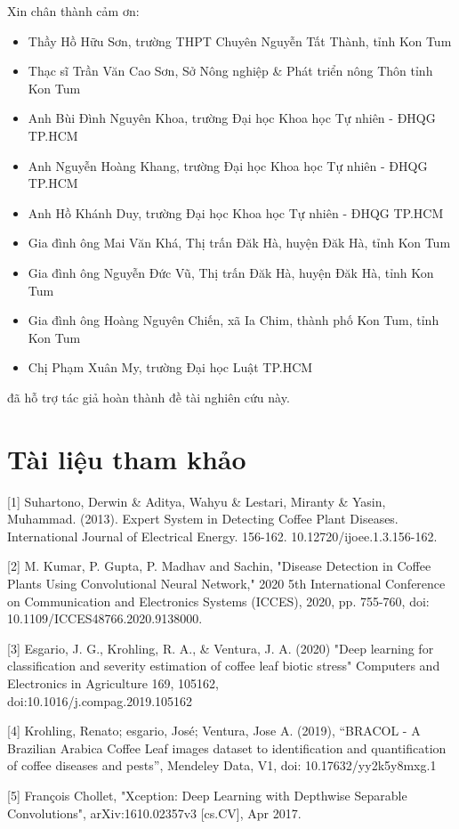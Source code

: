 \documentclass[a4paper,14pt]{extarticle}
\begin{document}
Xin chân thành cảm ơn:
\begin{itemize}
	\item Thầy Hồ Hữu Sơn, trường THPT Chuyên Nguyễn Tất Thành, tỉnh Kon Tum
	\item Thạc sĩ Trần Văn Cao Sơn, Sở Nông nghiệp \& Phát triển nông Thôn tỉnh Kon Tum
	\item Anh Bùi Đình Nguyên Khoa, trường Đại học Khoa học Tự nhiên - ĐHQG TP.HCM
	\item Anh Nguyễn Hoàng Khang, trường Đại học Khoa học Tự nhiên - ĐHQG TP.HCM
	\item Anh Hồ Khánh Duy, trường Đại học Khoa học Tự nhiên - ĐHQG TP.HCM
	\item Gia đình ông Mai Văn Khá, Thị trấn Đăk Hà, huyện Đăk Hà, tỉnh Kon Tum
	\item Gia đình ông Nguyễn Đức Vũ, Thị trấn Đăk Hà, huyện Đăk Hà, tỉnh Kon Tum
	\item Gia đình ông Hoàng Nguyên Chiến, xã Ia Chim, thành phố Kon Tum, tỉnh Kon Tum
	\item Chị Phạm Xuân My, trường Đại học Luật TP.HCM
\end{itemize}
	đã hỗ trợ tác giả hoàn thành đề tài nghiên cứu này.

\section{Tài liệu tham khảo}
[1] Suhartono, Derwin \& Aditya, Wahyu \& Lestari, Miranty \& Yasin, Muhammad. (2013). Expert System in Detecting Coffee Plant Diseases. International Journal of Electrical Energy. 156-162. 10.12720/ijoee.1.3.156-162.

[2] M. Kumar, P. Gupta, P. Madhav and Sachin, "Disease Detection in Coffee Plants Using Convolutional Neural Network," 2020 5th International Conference on Communication and Electronics Systems (ICCES), 2020, pp. 755-760, doi: 10.1109/ICCES48766.2020.9138000.

[3] Esgario, J. G., Krohling, R. A., \& Ventura, J. A. (2020) "Deep learning for classification and severity estimation of coffee leaf biotic stress" Computers and Electronics in Agriculture 169, 105162,\\doi:10.1016/j.compag.2019.105162

[4] Krohling, Renato; esgario, José; Ventura, Jose A. (2019), “BRACOL - A Brazilian Arabica Coffee Leaf images dataset to identification and quantification of coffee diseases and pests”, Mendeley Data, V1, doi: 10.17632/yy2k5y8mxg.1

[5] François Chollet, "Xception: Deep Learning with Depthwise Separable Convolutions", arXiv:1610.02357v3 [cs.CV], Apr 2017.
\end{document}

